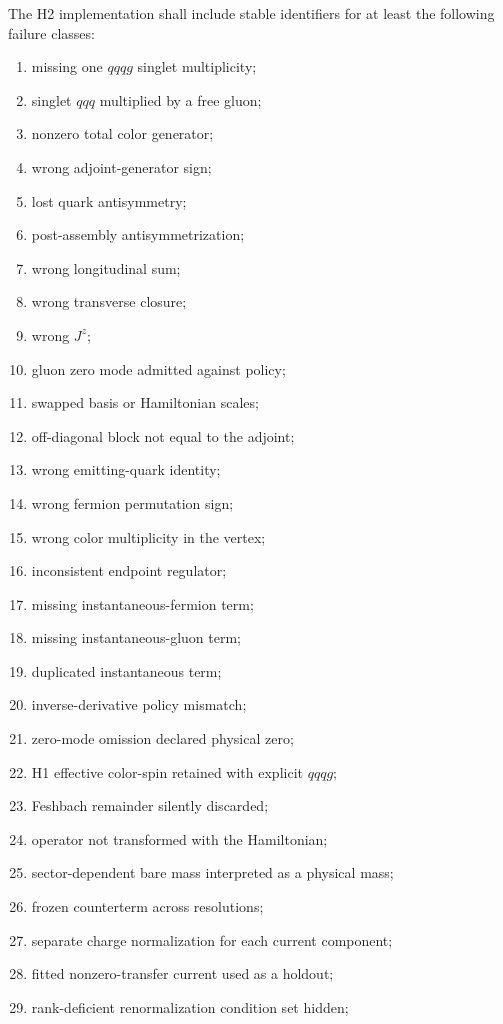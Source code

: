 \documentclass[11pt]{article}
\newcommand{\Jz}{J^z}
\begin{document}
The H2 implementation shall include stable identifiers for at least the
following failure classes:
\begin{enumerate}
 \item missing one \(qqqg\) singlet multiplicity;
 \item singlet \(qqq\) multiplied by a free gluon;
 \item nonzero total color generator;
 \item wrong adjoint-generator sign;
 \item lost quark antisymmetry;
 \item post-assembly antisymmetrization;
 \item wrong longitudinal sum;
 \item wrong transverse closure;
 \item wrong \(\Jz\);
 \item gluon zero mode admitted against policy;
 \item swapped basis or Hamiltonian scales;
 \item off-diagonal block not equal to the adjoint;
 \item wrong emitting-quark identity;
 \item wrong fermion permutation sign;
 \item wrong color multiplicity in the vertex;
 \item inconsistent endpoint regulator;
 \item missing instantaneous-fermion term;
 \item missing instantaneous-gluon term;
 \item duplicated instantaneous term;
 \item inverse-derivative policy mismatch;
 \item zero-mode omission declared physical zero;
 \item H1 effective color-spin retained with explicit \(qqqg\);
 \item Feshbach remainder silently discarded;
 \item operator not transformed with the Hamiltonian;
 \item sector-dependent bare mass interpreted as a physical mass;
 \item frozen counterterm across resolutions;
 \item separate charge normalization for each current component;
 \item fitted nonzero-transfer current used as a holdout;
 \item rank-deficient renormalization condition set hidden;

\end{enumerate}
\end{document}
